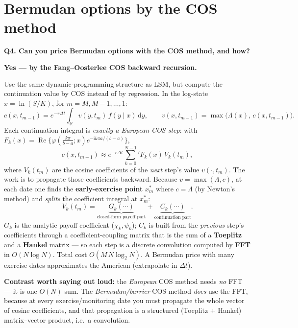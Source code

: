 \documentclass[11pt]{article}
\newcommand{\R}{\mathbb{R}}
\newcommand{\Real}{\operatorname{Re}}
\newcommand{\ii}{\mathrm{i}}
\newcommand{\dd}{\,\mathrm{d}}
\newcommand{\ch}{\varphi}
\newcommand{\psumN}{{\sum_{k=0}^{N-1}}'}
\newcommand{\Qhead}[1]{\bigskip\noindent\textbf{\large #1}\par\nobreak\smallskip}
\begin{document}
\section{Bermudan options by the COS method}
\Qhead{Q4. Can you price Bermudan options with the COS method, and how?}
\textbf{Yes --- by the Fang--Oosterlee COS backward recursion.}

Use the same dynamic-programming structure as LSM, but compute the continuation value by COS instead of by
regression. In the log-state $x=\ln(S/K)$, for $m=M,M-1,\dots,1$:
\begin{equation}\label{eq:berm}
c(x,t_{m-1})=e^{-r\Delta t}\!\int_{\R} v(y,t_m)\,f(y\mid x)\dd y,
\qquad v(x,t_{m-1})=\max\big(\Lambda(x),\,c(x,t_{m-1})\big).
\end{equation}
Each continuation integral is \emph{exactly a European COS step}: with
$F_k(x)=\Real\{\ch(\tfrac{k\pi}{b-a};x)e^{-\ii k\pi a/(b-a)}\}$,
\[
c(x,t_{m-1})\approx e^{-r\Delta t}\psumN F_k(x)\,V_k(t_m),
\]
where $V_k(t_m)$ are the cosine coefficients of the \emph{next} step's value $v(\cdot,t_m)$. The work is to
propagate those coefficients backward. Because $v=\max(\Lambda,c)$, at each date one finds the
\textbf{early-exercise point} $x_m^\ast$ where $c=\Lambda$ (by Newton's method) and \emph{splits} the
coefficient integral at $x_m^\ast$:
\[
V_k(t_m)=\underbrace{G_k(\cdots)}_{\text{closed-form payoff part}}+\underbrace{C_k(\cdots)}_{\text{continuation part}} .
\]
$G_k$ is the analytic payoff coefficient ($\chi_k,\psi_k$); $C_k$ is built from the \emph{previous} step's
coefficients through a coefficient-coupling matrix that is the sum of a \textbf{Toeplitz} and a \textbf{Hankel}
matrix --- so each step is a discrete convolution computed by \textbf{FFT} in $O(N\log N)$. Total cost
$O(M\,N\log_2 N)$. A Bermudan price with many exercise dates approximates the American (extrapolate in $\Delta t$).

\begin{keybox}
\textbf{Contrast worth saying out loud:} the \emph{European} COS method needs \emph{no} FFT --- it is one
$O(N)$ sum. The \emph{Bermudan/barrier} COS method \emph{does} use the FFT, because at every exercise/monitoring
date you must propagate the whole vector of cosine coefficients, and that propagation is a structured
(Toeplitz $+$ Hankel) matrix--vector product, i.e.\ a convolution.
\end{keybox}
\end{document}
